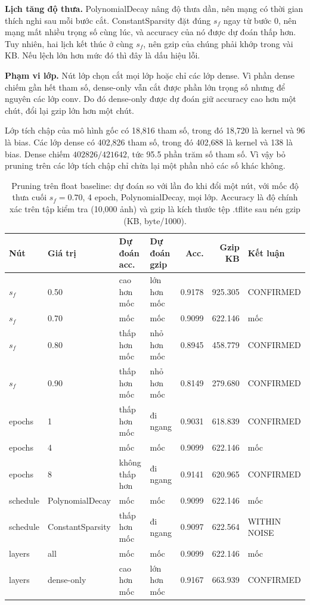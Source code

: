 \documentclass[13pt,a4paper]{article}
\begin{document}
\textbf{Lịch tăng độ thưa.} PolynomialDecay nâng độ thưa dần, nên mạng có thời gian thích nghi sau mỗi bước cắt. ConstantSparsity đặt đúng \(s_f\) ngay từ bước 0, nên mạng mất nhiều trọng số cùng lúc, và accuracy của nó được dự đoán thấp hơn. Tuy nhiên, hai lịch kết thúc ở cùng \(s_f\), nên gzip của chúng phải khớp trong vài KB. Nếu lệch lớn hơn mức đó thì đây là dấu hiệu lỗi.

\textbf{Phạm vi lớp.} Nút lớp chọn cắt mọi lớp hoặc chỉ các lớp dense. Vì phần dense chiếm gần hết tham số, dense-only vẫn cắt được phần lớn trọng số nhưng để nguyên các lớp conv. Do đó dense-only được dự đoán giữ accuracy cao hơn một chút, đổi lại gzip lớn hơn một chút.

Lớp tích chập của mô hình gốc có 18{,}816 tham số, trong đó 18{,}720 là kernel và 96 là bias.
Các lớp dense có 402{,}826 tham số, trong đó 402{,}688 là kernel và 138 là bias.
Dense chiếm \(402826/421642\), tức 95.5 phần trăm số tham số.
Vì vậy bỏ pruning trên các lớp tích chập chỉ chừa lại một phần nhỏ các số khác không.

\begin{table}[H]
\centering
\caption{Pruning trên float baseline: dự đoán so với lần đo khi đổi một nút, với mốc độ thưa cuối \(s_f=0.70\), 4 epoch, PolynomialDecay, mọi lớp. Accuracy là độ chính xác trên tập kiểm tra (10{,}000 ảnh) và gzip là kích thước tệp .tflite sau nén gzip (KB, byte/1000).}
\label{tab:sweep-prune}
\begin{tabular}{|l|l|l|l|r|r|l|}
\hline
Nút & Giá trị & Dự đoán acc. & Dự đoán gzip & Acc. & Gzip KB & Kết luận \\ \hline
\(s_f\) & 0.50 & cao hơn mốc & lớn hơn mốc & 0.9178 & 925.305 & CONFIRMED \\ \hline
\(s_f\) & 0.70 & mốc & mốc & 0.9099 & 622.146 & mốc \\ \hline
\(s_f\) & 0.80 & thấp hơn mốc & nhỏ hơn mốc & 0.8945 & 458.779 & CONFIRMED \\ \hline
\(s_f\) & 0.90 & thấp hơn mốc & nhỏ hơn mốc & 0.8149 & 279.680 & CONFIRMED \\ \hline
epochs & 1 & thấp hơn mốc & đi ngang & 0.9031 & 618.839 & CONFIRMED \\ \hline
epochs & 4 & mốc & mốc & 0.9099 & 622.146 & mốc \\ \hline
epochs & 8 & không thấp hơn & đi ngang & 0.9141 & 620.965 & CONFIRMED \\ \hline
schedule & PolynomialDecay & mốc & mốc & 0.9099 & 622.146 & mốc \\ \hline
schedule & ConstantSparsity & thấp hơn mốc & đi ngang & 0.9097 & 622.564 & WITHIN NOISE \\ \hline
layers & all & mốc & mốc & 0.9099 & 622.146 & mốc \\ \hline
layers & dense-only & cao hơn mốc & lớn hơn mốc & 0.9167 & 663.939 & CONFIRMED \\ \hline
\end{tabular}
\end{table}
\end{document}
